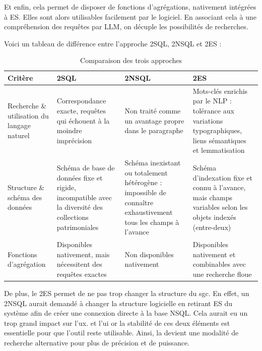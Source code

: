 Et enfin, cela permet de disposer de fonctions d'agrégations, nativement intégrées à \gls{ES}. Elles sont alors utilisables facilement par le logiciel. En associant cela à une compréhension des requêtes par \gls{LLM}, on décuple les possibilités de recherches.


Voici un tableau de différence entre l'approche \gls{2SQL}, \gls{2NSQL} et \gls{2ES} : \vspace{0.5cm} %

\begin{table}[H]
	\centering
	\renewcommand{\arraystretch}{1.4}
	\begin{tabular}{|p{3.4cm}|p{3.6cm}|p{3.6cm}|p{3.6cm}|}
		\hline
		\textbf{Critère} & \textbf{\gls{2SQL}} & \textbf{\gls{2NSQL}} & \textbf{\gls{2ES}} \\
		\hline
		Recherche \& utilisation du langage naturel &
		Correspondance exacte, requêtes qui échouent à la moindre imprécision &
		Non traité comme un avantage propre dans le paragraphe &
		Mots-clés enrichis par le \gls{NLP} : tolérance aux variations typographiques, liens sémantiques et lemmatisation \\
		\hline
		Structure \& schéma des données &
		Schéma de base de données fixe et rigide, incompatible avec la diversité des collections patrimoniales &
		Schéma inexistant ou totalement hétérogène : impossible de connaître exhaustivement tous les champs à l'avance &
		Schéma d'indexation fixe et connu à l'avance, mais champs variables selon les objets indexés (entre-deux) \\
		\hline
		Fonctions d'agrégation &
		Disponibles nativement, mais nécessitent des requêtes exactes &
		Non disponibles nativement &
		Disponibles nativement et combinables avec une recherche floue \\
		\hline
	\end{tabular}
	\caption{Comparaison des trois approches}
	\label{tab:text2query-hybride}
\end{table}

De plus, le \gls{2ES} permet de ne pas trop changer la structure du \gls{sgc}. En effet, un \gls{2NSQL} aurait demandé à changer la structure logicielle en retirant \gls{ES} du système afin de créer une connexion directe à la base \gls{NSQL}. Cela aurait eu un trop grand impact sur l'\gls{ux}. et l'\gls{ui} or la stabilité de ces deux éléments est essentielle pour que l'outil reste utilisable. Ainsi, la  devient une modalité de recherche alternative pour plus de précision et de puissance.\newline

